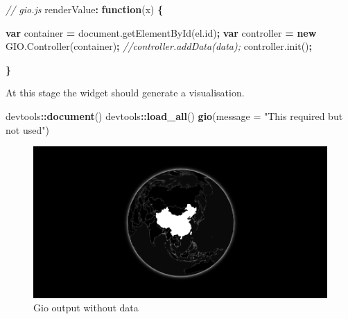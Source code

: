 \documentclass[
]{krantz}
\makeatletter
\newenvironment{Shaded}{\begin{snugshade}}{\end{snugshade}}
\newcommand{\AttributeTok}[1]{\textcolor[rgb]{0.61,0.61,0.61}{#1}}
\newcommand{\CommentTok}[1]{\textcolor[rgb]{0.37,0.37,0.37}{\textit{#1}}}
\newcommand{\DataTypeTok}[1]{\textcolor[rgb]{0.27,0.27,0.27}{#1}}
\newcommand{\KeywordTok}[1]{\textcolor[rgb]{0.27,0.27,0.27}{\textbf{#1}}}
\newcommand{\NormalTok}[1]{#1}
\newcommand{\OperatorTok}[1]{\textcolor[rgb]{0.43,0.43,0.43}{\textbf{#1}}}
\newcommand{\StringTok}[1]{\textcolor[rgb]{0.5,0.5,0.5}{#1}}
\newcommand{\VariableTok}[1]{\textcolor[rgb]{0,0,0}{#1}}
\newenvironment{kframe}{%
\medskip{}
\setlength{\fboxsep}{.8em}
 \def\at@end@of@kframe{}%
 \ifinner\ifhmode%
  \def\at@end@of@kframe{\end{minipage}}%
  \begin{minipage}{\columnwidth}%
 \fi\fi%
 \def\FrameCommand##1{\hskip\@totalleftmargin \hskip-\fboxsep
 \colorbox{shadecolor}{##1}\hskip-\fboxsep
     \hskip-\linewidth \hskip-\@totalleftmargin \hskip\columnwidth}%
 \MakeFramed {\advance\hsize-\width
   \@totalleftmargin\z@ \linewidth\hsize
   \@setminipage}}%
 {\par\unskip\endMakeFramed%
 \at@end@of@kframe}
\renewenvironment{Shaded}{\begin{kframe}}{\end{kframe}}
\makeatother
\begin{document}
\begin{Shaded}
\begin{Highlighting}[]
\CommentTok{// gio.js}
\NormalTok{renderValue}\OperatorTok{:} \KeywordTok{function}\NormalTok{(x) }\OperatorTok{\{}

  \KeywordTok{var}\NormalTok{ container }\OperatorTok{=} \VariableTok{document}\NormalTok{.}\AttributeTok{getElementById}\NormalTok{(}\VariableTok{el}\NormalTok{.}\AttributeTok{id}\NormalTok{)}\OperatorTok{;}
  \KeywordTok{var}\NormalTok{ controller }\OperatorTok{=} \KeywordTok{new} \VariableTok{GIO}\NormalTok{.}\AttributeTok{Controller}\NormalTok{(container)}\OperatorTok{;}
  \CommentTok{//controller.addData(data);}
  \VariableTok{controller}\NormalTok{.}\AttributeTok{init}\NormalTok{()}\OperatorTok{;}

\OperatorTok{\}}
\end{Highlighting}
\end{Shaded}

At this stage the widget should generate a visualisation.

\begin{Shaded}
\begin{Highlighting}[]
\NormalTok{devtools}\OperatorTok{::}\KeywordTok{document}\NormalTok{()}
\NormalTok{devtools}\OperatorTok{::}\KeywordTok{load\_all}\NormalTok{()}
\KeywordTok{gio}\NormalTok{(}\DataTypeTok{message =} \StringTok{"This required but not used"}\NormalTok{)}
\end{Highlighting}
\end{Shaded}

\begin{figure}[t]

{\centering \includegraphics[width=1\linewidth]{images/gio-init} 

}

\caption{Gio output without data}\label{fig:gio-init}
\end{figure}
\end{document}
